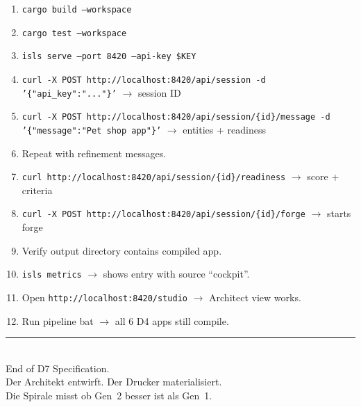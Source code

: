 \documentclass[11pt,a4paper]{article}
\begin{document}
\begin{enumerate}
\item \texttt{cargo build --workspace}
\item \texttt{cargo test --workspace}
\item \texttt{isls serve --port 8420 --api-key \$KEY}
\item \texttt{curl -X POST http://localhost:8420/api/session 
      -d '\{"api\_key":"..."\}'} $\to$ session ID
\item \texttt{curl -X POST http://localhost:8420/api/session/\{id\}/message 
      -d '\{"message":"Pet shop app"\}'} $\to$ entities + readiness
\item Repeat with refinement messages.
\item \texttt{curl http://localhost:8420/api/session/\{id\}/readiness}
      $\to$ score + criteria
\item \texttt{curl -X POST http://localhost:8420/api/session/\{id\}/forge}
      $\to$ starts forge
\item Verify output directory contains compiled app.
\item \texttt{isls metrics} $\to$ shows entry with source ``cockpit''.
\item Open \texttt{http://localhost:8420/studio} $\to$ Architect 
      view works.
\item Run pipeline bat $\to$ all 6 D4 apps still compile.
\end{enumerate}

\vfill
\begin{center}
\color{isls-gray}\rule{0.5\textwidth}{0.4pt}\\[0.5em]
{\small End of D7 Specification.\\[0.3em]
Der Architekt entwirft. Der Drucker materialisiert.\\
Die Spirale misst ob Gen~2 besser ist als Gen~1.}
\end{center}
\end{document}

